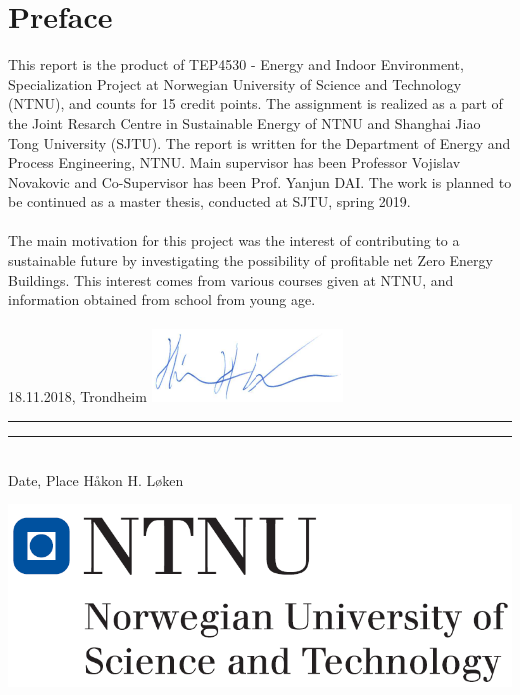 \documentclass{report}
\begin{document}
\pagestyle{empty} %

\clearpage
\thispagestyle{empty}
\newpage

\pagestyle{empty} %

\clearpage

\pagestyle{empty} %

\clearpage
\pagestyle{empty} %

\clearpage


% 
\chapter*{Preface}
This report is the product of TEP4530 - Energy and Indoor Environment, Specialization Project at Norwegian University of Science and Technology (NTNU), and counts for 15 credit points. The assignment is realized as a part of the Joint Resarch Centre in Sustainable Energy of NTNU and Shanghai Jiao Tong University (SJTU). The report is written for the Department of Energy and Process Engineering, NTNU. Main supervisor has been Professor Vojislav Novakovic and  Co-Supervisor has been Prof. Yanjun DAI. The work is planned to be continued as a master thesis, conducted at SJTU, spring 2019. \\
\\
The main motivation for this project was the interest of contributing to a sustainable future by investigating the possibility of profitable net Zero Energy Buildings.  This interest comes from various courses given at NTNU, and information obtained from school from young age.  \\
\vspace{4cm}
\\
18.11.2018, Trondheim \hfill \includegraphics[]{vedlegg/uskrift.png} \\
\noindent\rule{5cm}{0.4pt} \hfill \noindent\rule{5cm}{0.4pt} \\
Date, Place \hfill Håkon H. Løken \hspace{2.35cm} \\
\vfill
\begin{center}
\includegraphics[scale=0.35]{vedlegg/logo.png}
\end{center}
\end{document}
